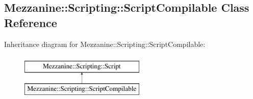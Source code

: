 \hypertarget{classMezzanine_1_1Scripting_1_1ScriptCompilable}{
\subsection{Mezzanine::Scripting::ScriptCompilable Class Reference}
\label{classMezzanine_1_1Scripting_1_1ScriptCompilable}
}
Inheritance diagram for Mezzanine::Scripting::ScriptCompilable:\begin{figure}[H]
\begin{center}
\leavevmode
\includegraphics[height=2.000000cm]{classMezzanine_1_1Scripting_1_1ScriptCompilable}
\end{center}
\end{figure}
